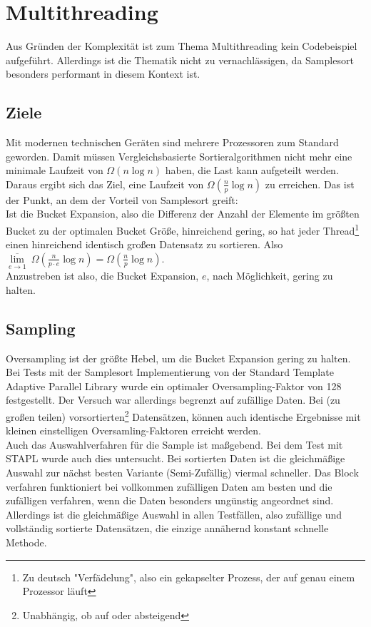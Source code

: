 \section{Multithreading}\label{sec:multithreading}
	Aus Gründen der Komplexität ist zum Thema Multithreading kein Codebeispiel aufgeführt.
	Allerdings ist die Thematik nicht zu vernachlässigen, da Samplesort besonders performant in diesem Kontext ist.
	
	\subsection{Ziele}
		Mit modernen technischen Geräten sind mehrere Prozessoren zum Standard geworden.
		Damit müssen Vergleichsbasierte Sortieralgorithmen nicht mehr eine minimale Laufzeit von $\Omega(n\log{n})$ haben, die Last kann aufgeteilt werden.
		Daraus ergibt sich das Ziel, eine Laufzeit von $\Omega\left(\frac{n}{p}\log{n}\right)$ zu erreichen.
		Das ist der Punkt, an dem der Vorteil von Samplesort greift:\\
		Ist die Bucket Expansion, also die Differenz der Anzahl der Elemente im größten Bucket zu der optimalen Bucket Größe, hinreichend gering, so hat jeder Thread\footnote{Zu deutsch "Verfädelung", also ein gekapselter Prozess, der auf genau einem Prozessor läuft} einen hinreichend identisch großen Datensatz zu sortieren.
		Also $\underset{e\to 1}{\overline\lim}\ \Omega\left(\frac{n}{p\cdot e}\log{n}\right)=\Omega\left(\frac{n}{p}\log{n}\right)$.\\
		Anzustreben ist also, die Bucket Expansion, $e$, nach Möglichkeit, gering zu halten.
		
	\subsection{Sampling}
		Oversampling ist der größte Hebel, um die Bucket Expansion gering zu halten.
		Bei Tests mit der Samplesort Implementierung von der Standard Template Adaptive Parallel Library \autocite{berlin-2007} wurde ein optimaler Oversampling-Faktor von 128 festgestellt.
		Der Versuch war allerdings begrenzt auf zufällige Daten.
		Bei (zu großen teilen) vorsortierten\footnote{Unabhängig, ob auf oder absteigend} Datensätzen, können auch identische Ergebnisse mit kleinen einstelligen Oversamling-Faktoren erreicht werden.\\
		Auch das Auswahlverfahren für die Sample ist maßgebend.
		Bei dem Test mit STAPL wurde auch dies untersucht.
		Bei sortierten Daten ist die gleichmäßige Auswahl zur nächst besten Variante (Semi-Zufällig) viermal schneller.
		Das Block verfahren funktioniert bei vollkommen zufälligen Daten am besten und die zufälligen verfahren, wenn die Daten besonders ungünstig angeordnet sind.
		Allerdings ist die gleichmäßige Auswahl in allen Testfällen, also zufällige und vollständig sortierte Datensätzen, die einzige annähernd konstant schnelle Methode.
		
